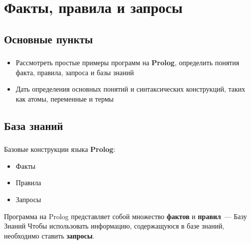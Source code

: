 \frame[plain]{\titlepage}


\section{Факты, правила и запросы}
\subsection{Основные пункты}

\begin{frame}
	\frametitle{\insertsection}
	\framesubtitle{\insertsubsection}
	\begin{itemize}
		\item Рассмотреть простые примеры программ на \textbf{Prolog}, определить понятия факта, правила, запроса и базы знаний
		\item Дать определения основных понятий и синтаксических конструкций, таких как атомы, переменные и термы
	\end{itemize}
\end{frame}

\subsection{База знаний}

\begin{frame}
	\frametitle{\insertsection}
	\framesubtitle{\insertsubsection}
	Базовые конструкции языка \textbf{Prolog}:
	\begin{itemize}
		\item Факты
		\item Правила
		\item Запросы
	\end{itemize}
	Программа на Prolog представляет собой множество \textbf{фактов} и \textbf{правил}~--- \alert{Базу Знаний}
	Чтобы использовать информацию, содержащуюся в базе знаний, необходимо ставить \textbf{запросы}.
\end{frame}


